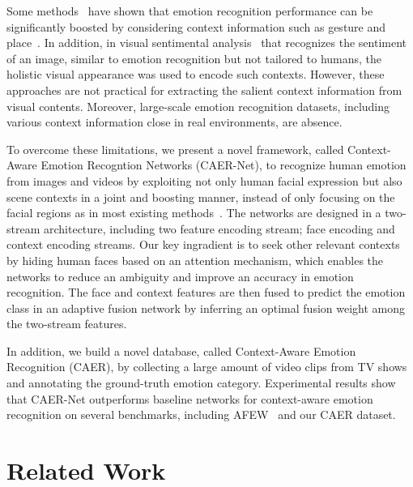 \documentclass[10pt,twocolumn,letterpaper]{article}
\begin{document}
Some methods~\cite{chen2016emotion, kosti2017emotion} have shown that emotion recognition performance can be significantly boosted by considering context information such as gesture and place~\cite{chen2016emotion, kosti2017emotion}.
In addition, in visual sentimental analysis~\cite{li2012context,yang2018weakly} that recognizes the sentiment of an image, similar to emotion recognition but not tailored to humans, the holistic visual appearance was used to encode such contexts.
However, these approaches are not practical for extracting the salient context information from visual contents. Moreover, large-scale emotion recognition datasets, including various context information close in real environments, are absence.

To overcome these limitations, we present a novel framework, called Context-Aware Emotion Recogntion Networks (CAER-Net), to recognize human emotion from images and videos by exploiting not only human facial expression but also scene contexts in a joint and boosting manner, instead of only focusing on the facial regions as in most existing methods~\cite{shan2009facial,zhong2012learning,fabian2016emotionet,li2018occlusion,li2017reliable}. The networks are designed in a two-stream architecture, including two feature encoding stream; face encoding and context encoding streams.
Our key ingradient is to seek other relevant contexts by hiding human faces based on an attention mechanism, which enables the networks to reduce an ambiguity and improve an accuracy in emotion recognition.
The face and context features are then fused to predict the emotion class in an adaptive fusion network by inferring an optimal fusion weight among the two-stream features.

In addition, we build a novel database, called Context-Aware Emotion Recognition (CAER), by collecting a large amount of video clips from TV shows and annotating the ground-truth emotion category.
Experimental results show that CAER-Net outperforms baseline networks for context-aware emotion recognition on several benchmarks, including AFEW~\cite{dhall2011acted} and our CAER dataset.

\section{Related Work}\label{sec:2}
\end{document}
